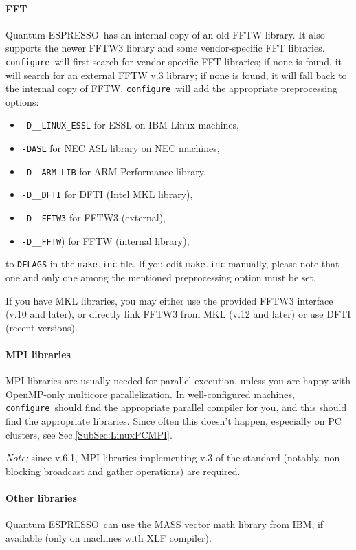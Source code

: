 \documentclass[12pt,a4paper]{article}
\def\qe{{\sc Quantum ESPRESSO}}
\def\configure{\texttt{configure}}
\begin{document}
\paragraph{FFT}
\qe\ has an internal copy of an old FFTW library. It also supports
the newer FFTW3 library and some vendor-specific FFT libraries.
\configure\ will first search for vendor-specific FFT libraries;
if none is found, it will search for an external FFTW v.3 library;
if none is found, it will fall back to the internal  copy of FFTW.
\configure\ will add the appropriate preprocessing options:
\begin{itemize}
\item \texttt{-D\_\_LINUX\_ESSL} for ESSL on IBM Linux machines,
\item \texttt{-DASL} for NEC ASL library on NEC machines,
\item \texttt{-D\_\_ARM\_LIB} for ARM Performance library,
\item \texttt{-D\_\_DFTI}  for DFTI (Intel MKL library),
\item \texttt{-D\_\_FFTW3} for FFTW3 (external),
\item \texttt{-D\_\_FFTW}) for FFTW (internal library),
\end{itemize}
to \texttt{DFLAGS} in the \texttt{make.inc} file.
If you edit \texttt{make.inc} manually, please note that one and
only one among the mentioned preprocessing option must be set.

If you have MKL libraries, you may either use the provided FFTW3
interface (v.10 and later), or directly link FFTW3 from MKL (v.12
and later) or use DFTI (recent versions).

\paragraph{MPI libraries}
MPI libraries are usually needed for parallel execution, unless you are 
happy with OpenMP-only multicore parallelization.
In well-configured machines, \configure\ should find the appropriate
parallel compiler for you, and this should find the appropriate
libraries. Since often this doesn't
happen, especially on PC clusters, see Sec.\ref{SubSec:LinuxPCMPI}.

{\em Note:} since v.6.1, MPI libraries implementing v.3 of the standard
(notably, non-blocking broadcast and gather operations) are required.


\paragraph{Other libraries}
\qe\ can use the MASS vector math
library from IBM, if available (only on machines with XLF compiler).
\end{document}

